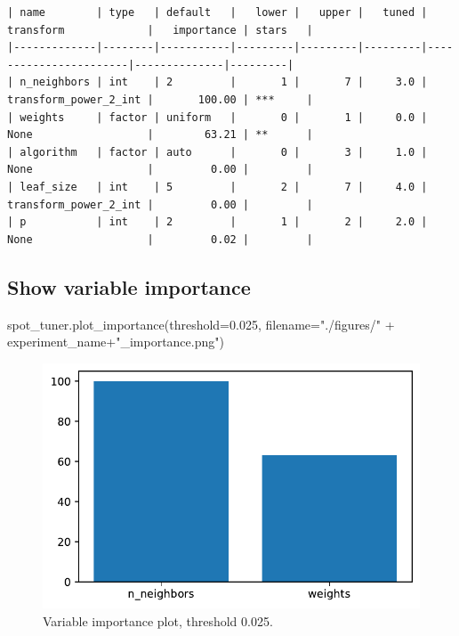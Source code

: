 \documentclass[
  letterpaper,
  DIV=11,
  numbers=noendperiod]{scrreprt}
\newenvironment{Shaded}{\begin{snugshade}}{\end{snugshade}}
\newcommand{\FloatTok}[1]{\textcolor[rgb]{0.68,0.00,0.00}{#1}}
\newcommand{\NormalTok}[1]{\textcolor[rgb]{0.00,0.23,0.31}{#1}}
\newcommand{\OperatorTok}[1]{\textcolor[rgb]{0.37,0.37,0.37}{#1}}
\newcommand{\StringTok}[1]{\textcolor[rgb]{0.13,0.47,0.30}{#1}}
\begin{document}
\begin{verbatim}
| name        | type   | default   |   lower |   upper |   tuned | transform             |   importance | stars   |
|-------------|--------|-----------|---------|---------|---------|-----------------------|--------------|---------|
| n_neighbors | int    | 2         |       1 |       7 |     3.0 | transform_power_2_int |       100.00 | ***     |
| weights     | factor | uniform   |       0 |       1 |     0.0 | None                  |        63.21 | **      |
| algorithm   | factor | auto      |       0 |       3 |     1.0 | None                  |         0.00 |         |
| leaf_size   | int    | 5         |       2 |       7 |     4.0 | transform_power_2_int |         0.00 |         |
| p           | int    | 2         |       1 |       2 |     2.0 | None                  |         0.02 |         |
\end{verbatim}

\hypertarget{show-variable-importance-4}{%
\subsection{Show variable importance}\label{show-variable-importance-4}}

\begin{Shaded}
\begin{Highlighting}[]
\NormalTok{spot\_tuner.plot\_importance(threshold}\OperatorTok{=}\FloatTok{0.025}\NormalTok{, filename}\OperatorTok{=}\StringTok{"./figures/"} \OperatorTok{+}\NormalTok{ experiment\_name}\OperatorTok{+}\StringTok{"\_importance.png"}\NormalTok{)}
\end{Highlighting}
\end{Shaded}

\begin{figure}[H]

{\centering \includegraphics{19_spot_hpt_sklearn_multiclass_classification_knn_files/figure-pdf/cell-27-output-1.pdf}

}

\caption{Variable importance plot, threshold 0.025.}

\end{figure}
\end{document}
